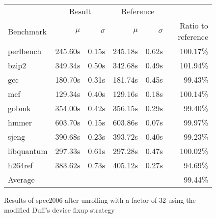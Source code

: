 \begin{figure}[h]
    \begin{center}
        \begin{tabular}{lrrrrr}
            \toprule
            & \multicolumn{2}{c}{Result} & \multicolumn{2}{c}{Reference}\\
            Benchmark & $\mu$ & $\sigma$ & $\mu$ & $\sigma$ & Ratio to reference\\
            \midrule
            perlbench & 245.60s & 0.15s & 245.18s & 0.62s & 100.17\%\\
            bzip2 & 349.34s & 0.50s & 342.68s & 0.49s & 101.94\%\\
            gcc & 180.70s & 0.31s & 181.74s & 0.45s & 99.43\%\\
            mcf & 129.34s & 0.40s & 129.16s & 0.18s & 100.14\%\\
            gobmk & 354.00s & 0.42s & 356.15s & 0.29s & 99.40\%\\
            hmmer & 603.70s & 0.15s & 603.86s & 0.07s & 99.97\%\\
            sjeng & 390.68s & 0.23s & 393.72s & 0.40s & 99.23\%\\
            libquantum & 297.33s & 0.61s & 297.28s & 0.47s & 100.02\%\\
            h264ref & 383.62s & 0.73s & 405.12s & 0.27s & 94.69\%\\
            \midrule
            Average & & & & & 99.44\%\\
            \bottomrule
        \end{tabular}
    \end{center}
    \caption{Results of spec2006 after unrolling with a factor of 32 using the modified Duff's device fixup strategy}
    \label{fig:eval:perf:duff:32}
\end{figure}
